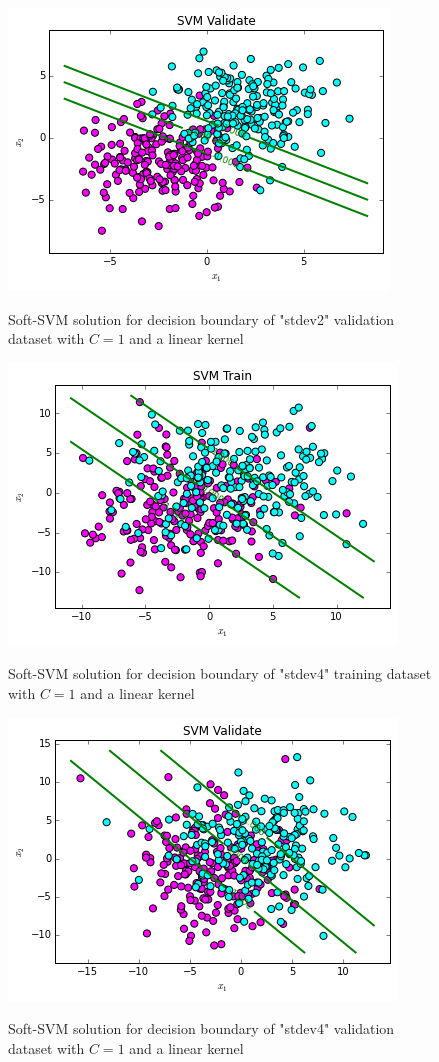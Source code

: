 \documentclass[10pt]{article}
\begin{document}
\begin{figure}
\centering
\includegraphics[scale=0.5]{svm_stdev2_val.png}
\label{svm_toy}
\caption{Soft-SVM solution for decision boundary of "stdev2" validation dataset with $C=1$ and a linear kernel}
\end{figure}
\begin{figure}
\centering
\includegraphics[scale=0.5]{svm_stdev4_train.png}
\label{svm_toy}
\caption{Soft-SVM solution for decision boundary of "stdev4" training dataset with $C=1$ and a linear kernel}
\end{figure}
\begin{figure}
\centering
\includegraphics[scale=0.5]{svm_stdev4_val.png}
\label{svm_toy}
\caption{Soft-SVM solution for decision boundary of "stdev4" validation dataset with $C=1$ and a linear kernel}
\end{figure}
\end{document}

